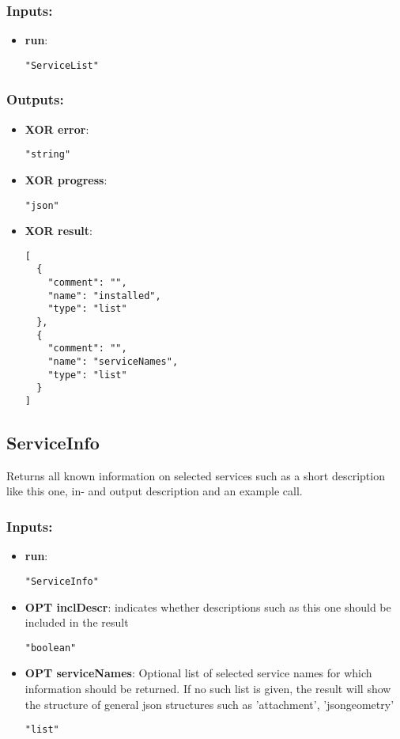 \subsubsection*{Inputs:}
\begin{itemize}
    \item \textbf{run}: 
\begin{lstlisting}
"ServiceList"
\end{lstlisting}
  \end{itemize}

\subsubsection*{Outputs:}
\begin{itemize}
    \item \textbf{XOR error}: 
\begin{lstlisting}
"string"
\end{lstlisting}
    \item \textbf{XOR progress}: 
\begin{lstlisting}
"json"
\end{lstlisting}
    \item \textbf{XOR result}: 
\begin{lstlisting}
[
  {
    "comment": "", 
    "name": "installed", 
    "type": "list"
  }, 
  {
    "comment": "", 
    "name": "serviceNames", 
    "type": "list"
  }
]
\end{lstlisting}
  \end{itemize}

\subsection{ServiceInfo}
Returns
 all known information on selected services such as a short description 
like this one, in- and output description and an example call. 
\subsubsection*{Inputs:}
\begin{itemize}
    \item \textbf{run}: 
\begin{lstlisting}
"ServiceInfo"
\end{lstlisting}
    \item \textbf{OPT inclDescr}: indicates whether descriptions such as this one should be included in the result
\begin{lstlisting}
"boolean"
\end{lstlisting}
    \item \textbf{OPT serviceNames}: Optional list of selected service names for which information should  be returned. If no such list is given, the result will show the  structure of general json structures such as 'attachment',  'jsongeometry'
\begin{lstlisting}
"list"
\end{lstlisting}
  \end{itemize}


